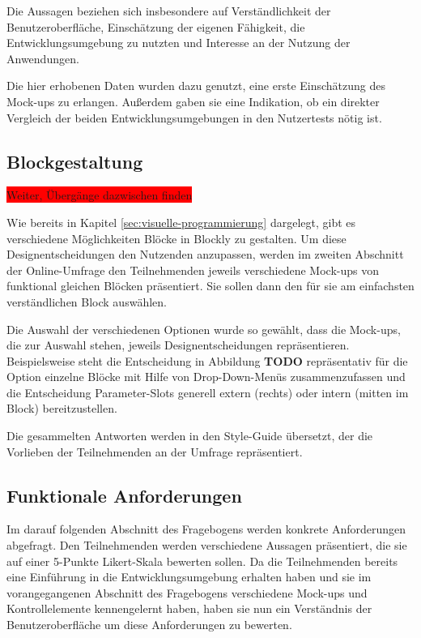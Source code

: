 Die Aussagen beziehen sich insbesondere auf Verständlichkeit der Benutzeroberfläche, Einschätzung der eigenen Fähigkeit, die Entwicklungsumgebung zu nutzten und Interesse an der Nutzung der Anwendungen. %

Die hier erhobenen Daten wurden dazu genutzt, eine erste Einschätzung des Mock-ups zu erlangen. Außerdem gaben sie eine Indikation, ob ein direkter Vergleich der beiden Entwicklungsumgebungen in den Nutzertests nötig ist.

\subsection{Blockgestaltung}
\colorbox{red}{Weiter, Übergänge dazwischen finden}

Wie bereits in Kapitel \ref{sec:visuelle-programmierung} dargelegt, gibt es verschiedene Möglichkeiten Blöcke in Blockly zu gestalten. Um diese Designentscheidungen den Nutzenden anzupassen, werden im zweiten Abschnitt der Online-Umfrage den Teilnehmenden jeweils verschiedene Mock-ups von funktional gleichen Blöcken präsentiert. Sie sollen dann den für sie am einfachsten verständlichen Block auswählen.

Die Auswahl der verschiedenen Optionen wurde so gewählt, dass die Mock-ups, die zur Auswahl stehen, jeweils Designentscheidungen repräsentieren. Beispielsweise steht die Entscheidung in Abbildung \textbf{TODO} repräsentativ für die Option einzelne Blöcke mit Hilfe von Drop-Down-Menüs zusammenzufassen und die Entscheidung Parameter-Slots generell extern (rechts) oder intern (mitten im Block) bereitzustellen. %

Die gesammelten Antworten werden in den Style-Guide übersetzt, der die Vorlieben der Teilnehmenden an der Umfrage repräsentiert.

\subsection{Funktionale Anforderungen}
Im darauf folgenden Abschnitt des Fragebogens werden konkrete Anforderungen abgefragt. Den Teilnehmenden werden verschiedene Aussagen präsentiert, die sie auf einer 5-Punkte Likert-Skala bewerten sollen. Da die Teilnehmenden bereits eine Einführung in die Entwicklungsumgebung erhalten haben und sie im vorangegangenen Abschnitt des Fragebogens verschiedene Mock-ups und Kontrollelemente kennengelernt haben, haben sie nun ein Verständnis der Benutzeroberfläche um diese Anforderungen zu bewerten. %

